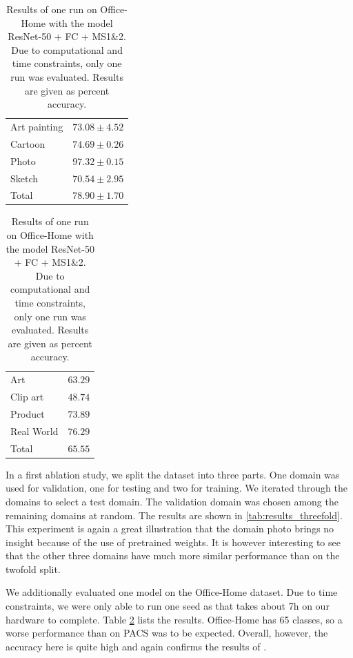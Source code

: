 \begin{table}[t]
    \centering
    \begin{minipage}[t]{0.48\textwidth}
        \centering
        \caption{Results of an ablation study on a threefold split of PACS into train, validation and test set. Results are given as mean $\pm$ standard deviation of percent accuracy. The model used was ResNet-50 + FC + MS1\&2 + FR1.}
        \label{tab:results_threefold}
        \vspace{.5em}
        \begin{tabular}{l | c}
            \toprule
            Art painting & $73.08 \pm 4.52$ \\
            Cartoon & $74.69 \pm 0.26$ \\
            Photo & $97.32 \pm 0.15$ \\
            Sketch & $70.54 \pm 2.95$ \\
            \midrule
            Total & $78.90 \pm 1.70$ \\
            \bottomrule
        \end{tabular}
    \end{minipage}
    \hfill
    \begin{minipage}[t]{0.48\textwidth}
        \centering
        \caption{Results of one run on Office-Home with the model ResNet-50 + FC + MS1\&2. Due to computational and time constraints, only one run was evaluated. Results are given as percent accuracy.}
        \label{tab:results_office-home}
        \vspace{.5em}
        \begin{tabular}{l | c}
            \toprule
            Art & $63.29$ \\
            Clip art & $48.74$ \\
            Product & $73.89$ \\
            Real World & $76.29$ \\
            \midrule
            Total & $65.55$ \\
            \bottomrule
        \end{tabular}
    \end{minipage}
\end{table}

In a first ablation study, we split the dataset into three parts. One domain was used for validation, one for testing and two for training. We iterated through the domains to select a test domain. The validation domain was chosen among the remaining domains at random. The results are shown in \ref{tab:results_threefold}. This experiment is again a great illustration that the domain photo brings no insight because of the use of pretrained weights. It is however interesting to see that the other three domains have much more similar performance than on the twofold split.

We additionally evaluated one model on the Office-Home dataset. Due to time constraints, we were only able to run one seed as that takes about 7h on our hardware to complete. Table \ref{tab:results_office-home} lists the results. Office-Home has 65 classes, so a worse performance than on PACS was to be expected. Overall, however, the accuracy here is quite high and again confirms the results of \cite{mixstyle_ref}.
